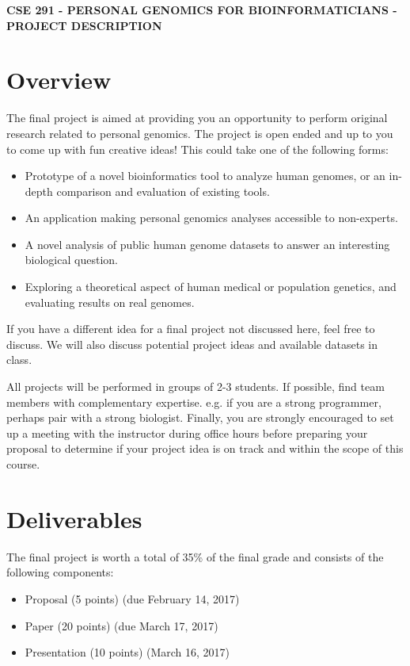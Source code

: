 \documentclass[12pt]{article}
\begin{document}
\textbf{CSE 291 - PERSONAL GENOMICS FOR BIOINFORMATICIANS - PROJECT DESCRIPTION}

\section*{Overview}
The final project is aimed at providing you an opportunity to perform original research related to personal genomics. The project is open ended and up to you to come up with fun creative ideas! This could take one of the following forms:

\begin{itemize}
\setlength\itemsep{0.0em}
\item Prototype of a novel bioinformatics tool to analyze human genomes, or an in-depth comparison and evaluation of existing tools.
\item An application making personal genomics analyses accessible to non-experts.
\item A novel analysis of public human genome datasets to answer an interesting biological question.
\item Exploring a theoretical aspect of human medical or population genetics, and evaluating results on real genomes.
\end{itemize}

If you have a different idea for a final project not discussed here, feel free to discuss. We will also discuss potential project ideas and available datasets in class.

All projects will be performed in groups of 2-3 students. If possible, find team members with complementary expertise. e.g. if you are a strong programmer, perhaps pair with a strong biologist. Finally, you are strongly encouraged to set up a meeting with the instructor during office hours before preparing your proposal to determine if your project idea is on track and within the scope of this course.

\section*{Deliverables}
The final project is worth a total of 35\% of the final grade and consists of the following components:

\begin{itemize}
\setlength\itemsep{0.0em}
\item Proposal (5 points) (due February 14, 2017)
\item Paper (20 points)  (due March 17, 2017)
\item Presentation (10 points) (March 16, 2017)
\end{itemize}
\end{document}
